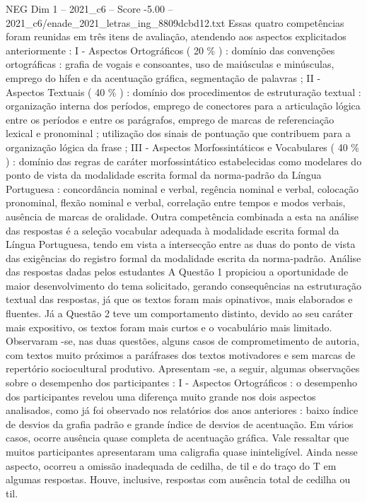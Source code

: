 \begin{textsample}{NEG Dim 1 – 2021\_c6 – Score -5.00 – 2021\_c6/enade\_2021\_letras\_ing\_8809dcbd12.txt}
Essas quatro competências foram reunidas em três itens de avaliação, atendendo aos aspectos explicitados anteriormente : I - Aspectos Ortográficos ( 20 \% ) : domínio das convenções ortográficas : grafia de vogais e consoantes, uso de maiúsculas e minúsculas, emprego do hífen e da acentuação gráfica, segmentação de palavras ; II - Aspectos Textuais ( 40 \% ) : domínio dos procedimentos de estruturação textual : organização interna dos períodos, emprego de conectores para a articulação lógica entre os períodos e entre os parágrafos, emprego de marcas de referenciação lexical e pronominal ; utilização dos sinais de pontuação que contribuem para a organização lógica da frase ; III - Aspectos Morfossintáticos e Vocabulares ( 40 \% ) : domínio das regras de caráter morfossintático estabelecidas como modelares do ponto de vista da modalidade escrita formal da norma-padrão da Língua Portuguesa : concordância nominal e verbal, regência nominal e verbal, colocação pronominal, flexão nominal e verbal, correlação entre tempos e modos verbais, ausência de marcas de oralidade.
Outra competência combinada a esta na análise das respostas é a seleção vocabular adequada à modalidade escrita formal da Língua Portuguesa, tendo em vista a intersecção entre as duas do ponto de vista das exigências do registro formal da modalidade escrita da norma-padrão.
Análise das respostas dadas pelos estudantes A Questão 1 propiciou a oportunidade de maior desenvolvimento do tema solicitado, gerando consequências na estruturação textual das respostas, já que os textos foram mais opinativos, mais elaborados e fluentes.
Já a Questão 2 teve um comportamento distinto, devido ao seu caráter mais expositivo, os textos foram mais curtos e o vocabulário mais limitado.
Observaram -se, nas duas questões, alguns casos de comprometimento de autoria, com textos muito próximos a paráfrases dos textos motivadores e sem marcas de repertório sociocultural produtivo.
Apresentam -se, a seguir, algumas observações sobre o desempenho dos participantes : I - Aspectos Ortográficos : o desempenho dos participantes revelou uma diferença muito grande nos dois aspectos analisados, como já foi observado nos relatórios dos anos anteriores : baixo índice de desvios da grafia padrão e grande índice de desvios de acentuação.
Em vários casos, ocorre ausência quase completa de acentuação gráfica.
Vale ressaltar que muitos participantes apresentaram uma caligrafia quase ininteligível.
Ainda nesse aspecto, ocorreu a omissão inadequada de cedilha, de til e do traço do T em algumas respostas.
Houve, inclusive, respostas com ausência total de cedilha ou til.

\end{textsample}
